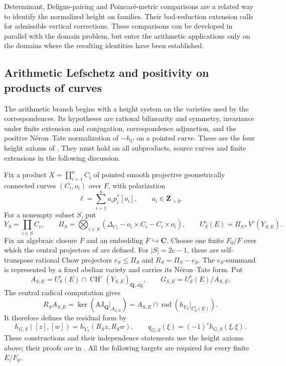 \documentclass[11pt]{article}
\theoremstyle{definition}
\numberwithin{equation}{section}
\newcommand{\CH}{\operatorname{CH}}
\newcommand{\Q}{\mathbf Q}
\newcommand{\alg}{\mathrm{alg}}
\begin{document}
Determinant, Deligne-pairing and Poincar\'e-metric comparisons are a related way to identify the normalized height on families. Their bad-reduction extension calls for admissible vertical corrections. These comparisons can be developed in parallel with the domain problem, but enter the arithmetic applications only on the domains where the resulting identities have been established.

\subsection{Arithmetic Lefschetz and positivity on products of curves}\label{sec:programme-arithmetic}

The arithmetic branch begins with a height system on the varieties used by the correspondences. Its hypotheses are rational bilinearity and symmetry, invariance under finite extension and conjugation, correspondence adjunction, and the positive N\'eron--Tate normalization of $-h_C$ on a pointed curve. These are the four height axioms of \cite[Section 1.1]{ArithmeticProgramme}. They must hold on all subproducts, source curves and finite extensions in the following discussion.

Fix a product $X=\prod_{i=1}^nC_i$ of pointed smooth projective geometrically connected curves $(C_i,o_i)$ over $F$, with polarization
\[
 \ell=\sum_{i=1}^n a_i p_i^*[o_i],\qquad a_i\in\mathbf Z_{>0}.
\]
For a nonempty subset $S$, put
\[
 Y_S=\prod_{i\in S}C_i,\qquad
 \Pi_S=\bigotimes_{i\in S}
   (\Delta_{C_i}-o_i\times C_i-C_i\times o_i),\qquad
 U_S^c(E)=\Pi_{S*}V^c(Y_{S,E}).
\]
Fix an algebraic closure $\overline F$ and an embedding $\overline F\hookrightarrow\mathbf C$. Choose one finite $F_0/F$ over which the central projectors of \cite{ArithmeticProgramme} are defined. For $|S|=2c-1$, these are self-transpose rational Chow projectors $e_S\le\Pi_S$ and $R_S=\Pi_S-e_S$. The $e_S$-summand is represented by a fixed abelian variety and carries its N\'eron--Tate form. Put
\[
 A_{S,E}=U_S^c(E)\cap\CH^c(Y_{S,E})_{\Q,\alg},
 \qquad G_{S,E}=U_S^c(E)/A_{S,E}.
\]
The central radical computation gives
\[
 R_SA_{S,E}=\ker(\mathrm{AJ}_\Q|_{A_{S,E}})
      =A_{S,E}\cap\operatorname{rad}(h_{Y_S}|_{U_S^c(E)}).
\]
It therefore defines the residual form by
\[
 h_{G,S}([z],[w])=h_{Y_S}(R_Sz,R_Sw),\qquad
 q_{G,S}(\xi)=(-1)^ch_{G,S}(\xi,\xi).
\]
These constructions and their independence statements use the height axioms above; their proofs are in \cite[Section 3]{ArithmeticReductions}. All the following targets are required for every finite $E/F_0$.
\end{document}
